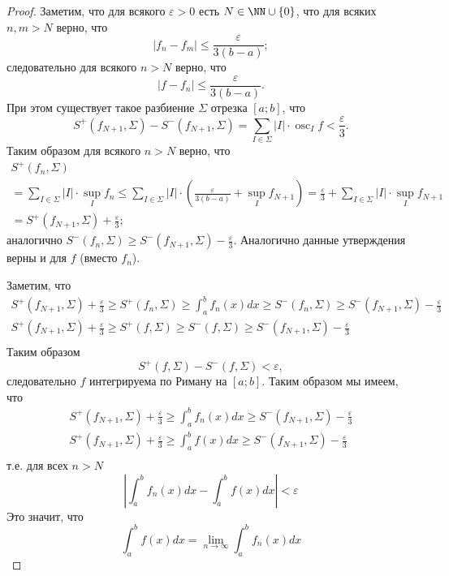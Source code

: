 \documentclass[12pt,a4paper]{article}
\DeclareMathOperator*{\osc}{osc}
\begin{document}
    \begin{proof}
        Заметим, что для всякого $\varepsilon > 0$ есть $N \in \NN \cup \{0\}$, что для всяких $n, m > N$ верно, что
        \[|f_n - f_m| \leqslant \frac{\varepsilon}{3(b-a)};\]
        следовательно для всякого $n > N$ верно, что
        \[|f - f_n| \leqslant \frac{\varepsilon}{3(b-a)}.\]
        При этом существует такое разбиение $\Sigma$ отрезка $[a; b]$, что
        \[S^+(f_{N+1}, \Sigma) - S^-(f_{N+1}, \Sigma) = \sum_{I \in \Sigma} |I| \cdot \osc_I f < \frac{\varepsilon}{3}.\]
        Таким образом для всякого $n > N$ верно, что
        \begin{multline*}
            S^+(f_n, \Sigma)\\
            = \sum_{I \in \Sigma} |I| \cdot \sup_I f_n
            \leqslant \sum_{I \in \Sigma} |I| \cdot \left(\frac{\varepsilon}{3(b-a)} + \sup_I f_{N+1}\right)
            = \frac{\varepsilon}{3} + \sum_{I \in \Sigma} |I| \cdot \sup_I f_{N+1}\\
            = S^+(f_{N+1}, \Sigma) + \frac{\varepsilon}{3};
        \end{multline*}
        аналогично $S^-(f_n, \Sigma) \geqslant S^-(f_{N+1}, \Sigma) - \frac{\varepsilon}{3}$. Аналогично данные утверждения верны и для $f$ (вместо $f_n$).

        Заметим, что
        \begin{gather*}
            S^+(f_{N+1}, \Sigma) + \frac{\varepsilon}{3} \geqslant S^+(f_n, \Sigma) \geqslant \int_a^b f_n(x)dx \geqslant S^-(f_n, \Sigma) \geqslant S^-(f_{N+1}, \Sigma) - \frac{\varepsilon}{3}\\
            S^+(f_{N+1}, \Sigma) + \frac{\varepsilon}{3} \geqslant S^+(f, \Sigma) \geqslant S^-(f, \Sigma) \geqslant S^-(f_{N+1}, \Sigma) - \frac{\varepsilon}{3}\\
        \end{gather*}
        Таким образом
        \[S^+(f, \Sigma) - S^-(f, \Sigma) < \varepsilon,\]
        следовательно $f$ интегрируема по Риману на $[a; b]$. Таким образом мы имеем, что
        \begin{gather*}
            S^+(f_{N+1}, \Sigma) + \frac{\varepsilon}{3} \geqslant \int_a^b f_n(x)dx \geqslant S^-(f_{N+1}, \Sigma) - \frac{\varepsilon}{3}\\
            S^+(f_{N+1}, \Sigma) + \frac{\varepsilon}{3} \geqslant \int_a^b f(x)dx \geqslant S^-(f_{N+1}, \Sigma) - \frac{\varepsilon}{3}\\
        \end{gather*}
        т.е. для всех $n > N$
        \[\left|\int_a^b f_n(x)dx - \int_a^b f(x)dx\right| < \varepsilon\]
        Это значит, что
        \[\int_a^b f(x)dx = \lim_{n \to \infty} \int_a^b f_n(x)dx\]
    \end{proof}
\end{document}
